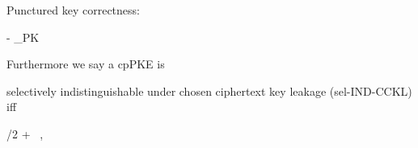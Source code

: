 \begin{definition}
\begin{sitemize}
        \item Punctured key correctness:
        \begin{bralign}
             - \alpha_{\textsf{PK}}\parr{\secpar}
        \end{bralign}
    \end{sitemize}
    Furthermore we say a cpPKE is
    \begin{sitemize}
        \item selectively indistinguishable under chosen ciphertext key leakage (sel-IND-CCKL) iff
        \begin{bralign}
            /2 + \varepsilon\parr{\secpar}
            \ ,
        \end{bralign}


\end{sitemize}
\end{definition}
